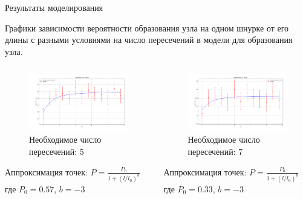 \begin{frame}{Результаты моделирования}
		\begin{block}{}
			Графики зависимости вероятности образования узла на одном шнурке от его длины с разными условиями на число пересечений в модели для образования узла.
		\end{block}



	\begin{columns}

		\begin{column}{0.5\linewidth}
			\begin{figure}[H]
				\includegraphics[width=1\linewidth]{img/model_5_er.png}
				Необходимое число пересечений: 5
			\end{figure}
			Аппроксимация точек:
			$P = \frac{P_0}{1+(l/l_0)^b}$
			где $P_0 = 0.57$, $b = -3$
		\end{column}

		\begin{column}{0.5\linewidth}
			\begin{figure}[H]
				\includegraphics[width=1\linewidth]{img/model_7_er.png}
				Необходимое число пересечений: 7
			\end{figure}
			Аппроксимация точек:
			$P = \frac{P_0}{1+(l/l_0)^b}$
			где $P_0 = 0.33$, $b = -3$
		\end{column}
	\end{columns}

\end{frame}

